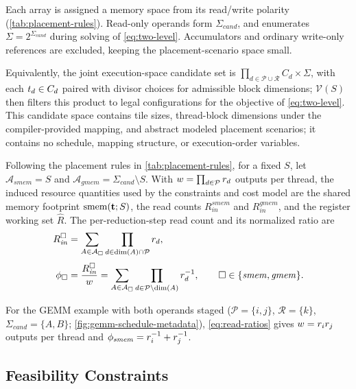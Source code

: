 Each array is assigned a memory space from its read/write polarity
(\autoref{tab:placement-rules}). Read-only operands form
\(\Sigma_{\mathit{cand}}\), and \name enumerates
\(\Sigma=2^{\Sigma_{\mathit{cand}}}\) during solving of
\autoref{eq:two-level}. Accumulators and ordinary write-only references are
excluded, keeping the placement-scenario space small.

Equivalently, the joint execution-space candidate set is \(\prod_{d\in\mathcal{P}\cup\mathcal{R}} C_d \times \Sigma\), with each \(t_d\in C_d\) paired with divisor choices for admissible block dimensions; \(\mathcal{V}(S)\) then filters this product to legal configurations for the objective of \autoref{eq:two-level}. This candidate space contains tile sizes, thread-block dimensions under the compiler-provided mapping, and abstract modeled placement scenarios; it contains no schedule, mapping structure, or execution-order variables.

Following the placement rules in \autoref{tab:placement-rules}, for a fixed \(S\), let \(\mathcal{A}_{\mathit{smem}}=S\) and \(\mathcal{A}_{\mathit{gmem}}=\Sigma_{\mathit{cand}}\setminus S\). With \(w=\prod_{d\in\mathcal{P}}r_d\) outputs per thread, the induced resource quantities used by the constraints and cost model are the shared memory footprint \(\operatorname{smem}(\mathbf{t};S)\), the read counts \(R^{\mathit{smem}}_{\mathit{in}}\) and \(R^{\mathit{gmem}}_{\mathit{in}}\), and the register working set \(\hat{R}\). The per-reduction-step read count and its normalized ratio are
\begin{equation}
\begin{aligned}
R^{\square}_{\mathit{in}}
&=\sum_{A \in \mathcal{A}_{\square}}
  \prod_{d \in \dim(A) \cap \mathcal{P}} r_d,\\[0.6ex]
\phi_{\square}
&=\dfrac{R^{\square}_{\mathit{in}}}{w}
 =\sum_{A \in \mathcal{A}_{\square}}
  \prod_{d \in \mathcal{P} \setminus \dim(A)} r_d^{-1},
\qquad \square \in \{\mathit{smem},\mathit{gmem}\}.
\end{aligned}
\label{eq:read-ratios}
\end{equation}

For the GEMM example with both operands staged (\(\mathcal{P}=\{i,j\}\), \(\mathcal{R}=\{k\}\), \(\Sigma_{\mathit{cand}}=\{A,B\}\); \autoref{fig:gemm-schedule-metadata}), \autoref{eq:read-ratios} gives \(w=r_ir_j\) outputs per thread and \(\phi_{\mathit{smem}}=r_i^{-1}+r_j^{-1}\).

\subsection{Feasibility Constraints}
\label{sec:constraints}
\label{sec:register-filter}

